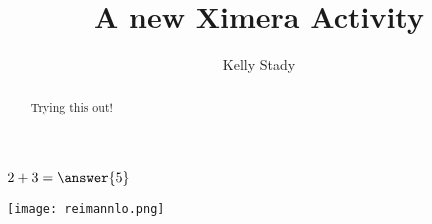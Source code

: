 \documentclass{ximera}
\title{A new Ximera Activity}
\author{Kelly Stady}
\begin{document}
\begin{abstract}
    Trying this out!
\end{abstract}
\maketitle


\begin{exercise}
    $2+3=\answer{5}$
\end{exercise}

\begin{center} %
\texttt{[image: reimannlo.png]}
\end{center}
\end{document}
